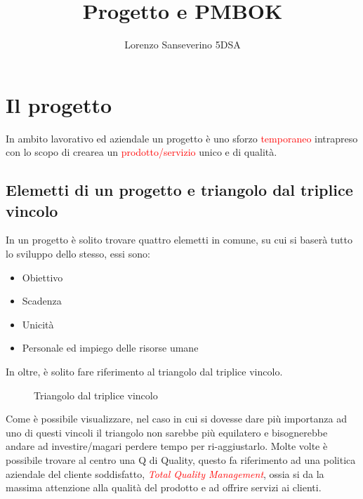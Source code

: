 \documentclass{article}
\title{Progetto e PMBOK}
\author{Lorenzo Sanseverino 5DSA}
\begin{document}
\maketitle


\tableofcontents
\section{Il progetto}

In ambito lavorativo ed aziendale un progetto è uno sforzo \textcolor{red}{temporaneo} intrapreso con lo scopo di crearea un \textcolor{red}{prodotto/servizio} unico e di qualità. 

\subsection{Elemetti di un progetto e triangolo dal triplice vincolo}
In un progetto è solito trovare quattro elemetti in comune, su cui si baserà tutto lo sviluppo dello stesso, essi sono:

\begin{itemize}
\item Obiettivo
\item Scadenza
\item Unicità
\item Personale ed impiego delle risorse umane
\end{itemize}

In oltre, è solito fare riferimento al triangolo dal triplice vincolo.
\begin{figure}[h]
\caption{Triangolo dal triplice vincolo}
\label{t}
\end{figure}
Come è possibile visualizzare, nel caso in cui si dovesse dare più importanza ad uno di questi vincoli il triangolo non sarebbe più equilatero e bisognerebbe andare ad investire/magari perdere tempo per ri-aggiustarlo.
Molte volte è possibile trovare al centro una Q di Quality, questo fa riferimento ad una politica aziendale del cliente soddisfatto, \textit{\textcolor{red}{Total Quality Management}}, ossia si da la massima attenzione alla qualità del prodotto e ad offrire servizi ai clienti.
\end{document}

